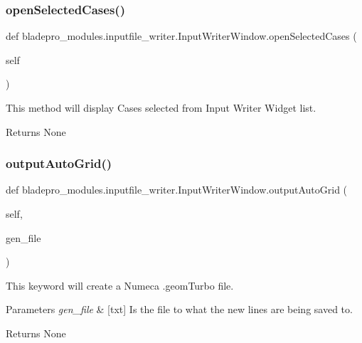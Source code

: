 \subsubsection{\texorpdfstring{open\+Selected\+Cases()}{openSelectedCases()}}
{\footnotesize\ttfamily def bladepro\+\_\+modules.\+inputfile\+\_\+writer.\+Input\+Writer\+Window.\+open\+Selected\+Cases (\begin{DoxyParamCaption}\item[{}]{self }\end{DoxyParamCaption})}



This method will display Cases selected from Input Writer Widget list. 

\begin{DoxyReturn}{Returns}
None 
\end{DoxyReturn}
\hypertarget{a00071_a61f9db1d33a2cb583c3f779a94ec700d}{}\label{a00071_a61f9db1d33a2cb583c3f779a94ec700d} 
\subsubsection{\texorpdfstring{output\+Auto\+Grid()}{outputAutoGrid()}}
{\footnotesize\ttfamily def bladepro\+\_\+modules.\+inputfile\+\_\+writer.\+Input\+Writer\+Window.\+output\+Auto\+Grid (\begin{DoxyParamCaption}\item[{}]{self,  }\item[{}]{gen\+\_\+file }\end{DoxyParamCaption})}



This keyword will create a Numeca .geom\+Turbo file. 


\begin{DoxyParams}{Parameters}
{\em gen\+\_\+file} & \mbox{[}txt\mbox{]} Is the file to what the new lines are being saved to. \\
\hline
\end{DoxyParams}
\begin{DoxyReturn}{Returns}
None 
\end{DoxyReturn}
\hypertarget{a00071_ab5d0d97e4bf1dd0ddf28f4f537fea598}{}\label{a00071_ab5d0d97e4bf1dd0ddf28f4f537fea598} 
